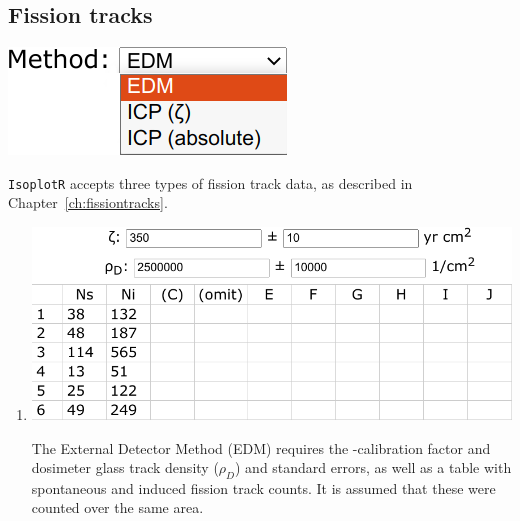 \begin{refsection}

\chapter{Fission tracks}\label{ch:FT-R}

\noindent\begin{minipage}[t]{.25\linewidth}
\strut\vspace*{-\baselineskip}\newline
\includegraphics[width=\linewidth]{../figures/FTformats.png}
\end{minipage}
\begin{minipage}[t]{.75\linewidth}
  \texttt{IsoplotR} accepts three types of fission track data, as
  described in Chapter~\ref{ch:fissiontracks}.
\end{minipage}

\begin{enumerate}

\item\noindent\begin{minipage}[t]{.60\linewidth}
\strut\vspace*{-\baselineskip}\newline
\includegraphics[width=\linewidth]{../figures/FTEDM.png}
\end{minipage}
\begin{minipage}[t]{.40\linewidth}
  The External Detector Method (EDM) requires the
  \textzeta-calibration factor and dosimeter glass track density
  ($\rho_D$) and standard errors, as well as a table with spontaneous
  and induced fission track counts. It is assumed that these were
  counted over the same area.
\end{minipage}


\end{enumerate}
\end{refsection}
